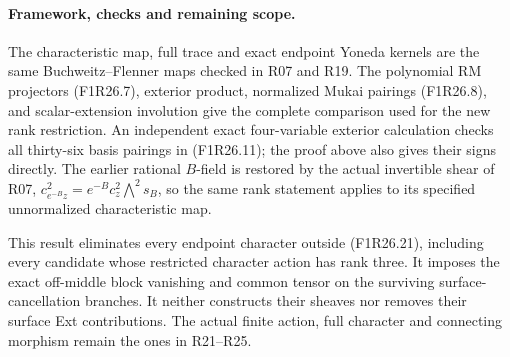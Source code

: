 \paragraph{Framework, checks and remaining scope.}
The characteristic map, full trace and exact
endpoint Yoneda kernels are the same
Buchweitz--Flenner maps checked in R07 and R19.
The polynomial RM projectors (F1R26.7),
exterior product, normalized Mukai pairings
(F1R26.8), and scalar-extension involution
give the complete comparison used for the
new rank restriction. An independent exact
four-variable exterior calculation checks
all thirty-six basis pairings in (F1R26.11);
the proof above also gives their signs directly.
The earlier rational $B$-field is restored
by the actual invertible shear of R07,
$c^2_{e^{-B}z}=e^{-B}c^2_z\bigwedge^2s_B$,
so the same rank statement applies to its
specified unnormalized characteristic map.

This result eliminates every endpoint character
outside (F1R26.21), including every candidate
whose restricted character action has rank
three. It imposes the exact off-middle block
vanishing and common tensor on the surviving
surface-cancellation branches. It neither
constructs their sheaves nor removes their
surface Ext contributions. The actual finite
action, full character and connecting morphism
remain the ones in R21--R25.
